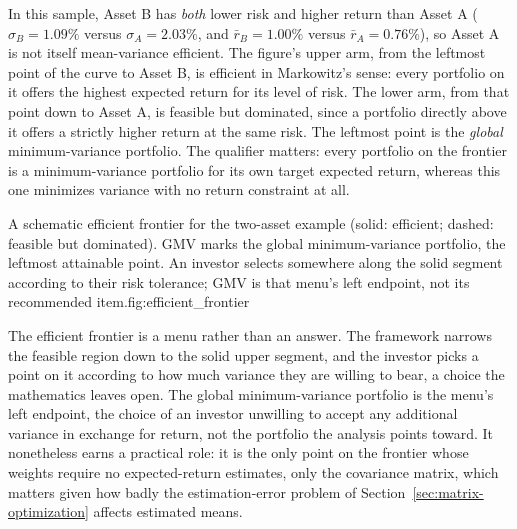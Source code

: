 \documentclass[../ai_in_finance]{subfiles}
\begin{document}
In this sample, Asset B has \emph{both} lower risk and higher return than Asset A ($\sigma_B=1.09\%$ versus $\sigma_A=2.03\%$, and $\bar r_B=1.00\%$ versus $\bar r_A=0.76\%$), so Asset A is not itself mean-variance efficient. The figure's upper arm, from the leftmost point of the curve to Asset B, is efficient in Markowitz's sense: every portfolio on it offers the highest expected return for its level of risk. The lower arm, from that point down to Asset A, is feasible but dominated, since a portfolio directly above it offers a strictly higher return at the same risk. The leftmost point is the \emph{global} minimum-variance portfolio. The qualifier matters: every portfolio on the frontier is a minimum-variance portfolio for its own target expected return, whereas this one minimizes variance with no return constraint at all.

\begin{bookfigure}{A schematic efficient frontier for the two-asset example (solid: efficient; dashed: feasible but dominated). GMV marks the global minimum-variance portfolio, the leftmost attainable point. An investor selects somewhere along the solid segment according to their risk tolerance; GMV is that menu's left endpoint, not its recommended item.}{fig:efficient_frontier}
\end{bookfigure}

The efficient frontier is a menu rather than an answer. The framework narrows the feasible region down to the solid upper segment, and the investor picks a point on it according to how much variance they are willing to bear, a choice the mathematics leaves open. The global minimum-variance portfolio is the menu's left endpoint, the choice of an investor unwilling to accept any additional variance in exchange for return, not the portfolio the analysis points toward. It nonetheless earns a practical role: it is the only point on the frontier whose weights require no expected-return estimates, only the covariance matrix, which matters given how badly the estimation-error problem of Section~\ref{sec:matrix-optimization} affects estimated means.
\end{document}
